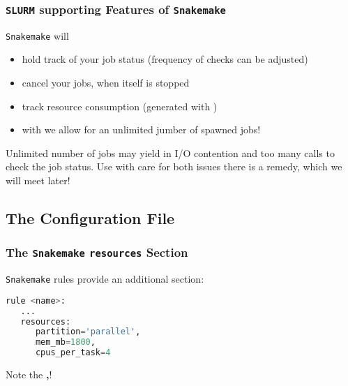 \begin{frame}[fragile]
  \frametitle{\texttt{SLURM} supporting Features of \texttt{Snakemake}}
  \texttt{Snakemake} will
  \begin{itemize}[<+->]
   \item hold track of your job status (frequency of checks can be adjusted)
   \item cancel your jobs, when itself is stopped
   \item track resource consumption (generated with )
   \item with  we allow for an unlimited jumber of spawned jobs!
  \end{itemize}
  \pause
  \begin{warning}
  	Unlimited number of jobs may yield in I/O contention and too many calls to check the job status. Use with care for both issues there is a remedy, which we will meet later!
  \end{warning}
\end{frame}

\subsection{The Configuration File}

\begin{frame}[fragile]
  \frametitle{The \texttt{Snakemake} \texttt{resources} Section}
  \texttt{Snakemake} rules provide an additional  section:
  \begin{lstlisting}[language=Python,style=Python]
rule <name>:
   ...
   resources:
      partition='parallel',
      mem_mb=1800,
      cpus_per_task=4
  \end{lstlisting}
  \begin{hint}
  	Note the \textbf{,}!
  \end{hint}
  \pause
\end{frame}

